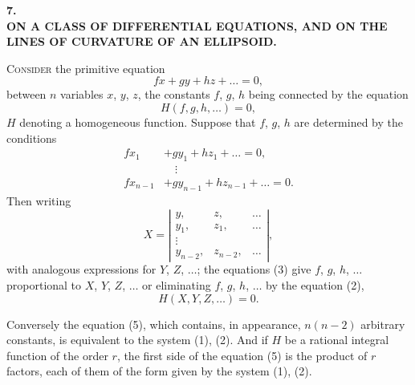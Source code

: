 \documentclass[11pt]{article}
\begin{document}
\bigskip

\begin{center}
\large\textbf{7.}\\[6pt]
\large\textbf{ON A CLASS OF DIFFERENTIAL EQUATIONS, AND ON THE LINES OF CURVATURE OF AN ELLIPSOID.}
\end{center}


\medskip

\noindent\textsc{Consider} the primitive equation
\[
f x + g y + h z + \ldots = 0 \tag{1},
\]
between $n$ variables $x$, $y$, $z$, the constants $f$, $g$, $h$ being connected by the equation
\[
H(f, g, h, \ldots) = 0 \tag{2},
\]
$H$ denoting a homogeneous function. Suppose that $f$, $g$, $h$ are determined by the conditions
\[
\begin{aligned}
f x_1     &+ g y_1     + h z_1     + \ldots = 0, \\
&\quad\vdots \\
f x_{n-1} &+ g y_{n-1} + h z_{n-1} + \ldots = 0.
\end{aligned}
\tag{3}
\]
Then writing
\[
X = \left|\begin{array}{cccc} y, & z, & \ldots \\ y_1, & z_1, & \ldots \\ \vdots & & \\ y_{n-2}, & z_{n-2}, & \ldots \end{array}\right| \tag{4},
\]
with analogous expressions for $Y$, $Z$, $\ldots$; the equations (3) give $f$, $g$, $h$, $\ldots$ proportional to $X$, $Y$, $Z$, $\ldots$ or eliminating $f$, $g$, $h$, $\ldots$ by the equation (2),
\[
H(X, Y, Z, \ldots) = 0 \tag{5}.
\]

Conversely the equation (5), which contains, in appearance, $n(n-2)$ arbitrary constants, is equivalent to the system (1), (2). And if $H$ be a rational integral function of the order $r$, the first side of the equation (5) is the product of $r$ factors, each of them of the form given by the system (1), (2).
\end{document}
